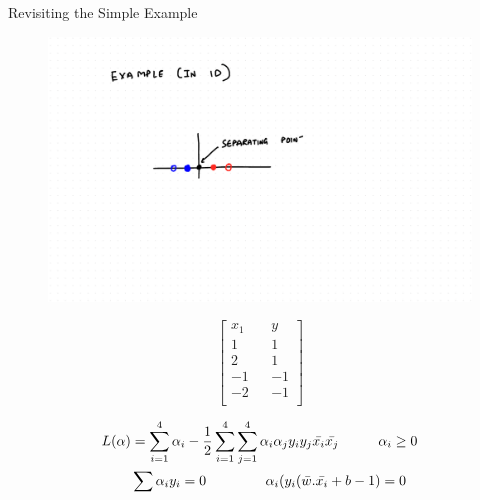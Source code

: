 \documentclass{beamer}
\begin{document}
\begin{frame}{Revisiting the Simple Example}
\begin{multicols}{2}

\begin{figure}
\includegraphics[scale = 0.25]{SVM/Svm-21.pdf}
\end{figure}

\begin{equation*}
\begin{bmatrix}
x_{1} && y \\
1 && 1\\
2 && 1\\
-1 && -1\\
-2 && -1\\
\end{bmatrix}
\end{equation*}
\end{multicols}
\begin{align*}
L(\alpha) &= \sum_{i=1}^{4} \alpha_{i} - \frac{1}{2}\sum_{i=1}^{4}\sum_{j=1}^{4}\alpha_{i}\alpha_{j}y_{i}y_{j}\bar{x_i}\bar{x_j} \hspace{1cm}\alpha_{i} \geq 0 \\
&\sum \alpha_{i}y_{i} = 0 \hspace{1.5cm}
\alpha_{i}(y_{i}(\bar{w}.\bar{x_i} + b - 1) = 0
\end{align*}

\end{frame}
\end{document}
